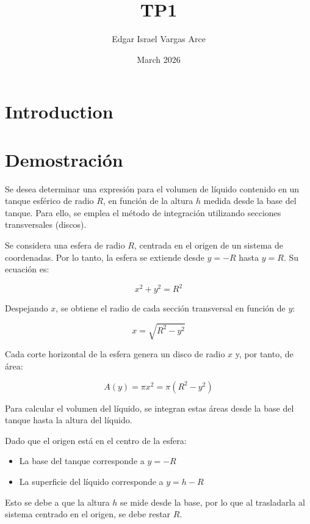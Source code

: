 \documentclass{article}
\title{TP1}
\author{Edgar Israel Vargas Arce}
\date{March 2026}
\begin{document}
\maketitle

\section{Introduction}

\section{Demostración}

Se desea determinar una expresión para el volumen de líquido contenido en un tanque esférico de radio $R$, en función de la altura $h$ medida desde la base del tanque. Para ello, se emplea el método de integración utilizando secciones transversales (discos).

Se considera una esfera de radio $R$, centrada en el origen de un sistema de coordenadas. Por lo tanto, la esfera se extiende desde $y = -R$ hasta $y = R$. Su ecuación es:

\begin{equation}
x^2 + y^2 = R^2
\end{equation}

Despejando $x$, se obtiene el radio de cada sección transversal en función de $y$:

\begin{equation}
x = \sqrt{R^2 - y^2}
\end{equation}

Cada corte horizontal de la esfera genera un disco de radio $x$ y, por tanto, de área:

\begin{equation}
A(y) = \pi x^2 = \pi (R^2 - y^2)
\end{equation}

Para calcular el volumen del líquido, se integran estas áreas desde la base del tanque hasta la altura del líquido.

Dado que el origen está en el centro de la esfera:
\begin{itemize}
\item La base del tanque corresponde a $y = -R$
\item La superficie del líquido corresponde a $y = h - R$
\end{itemize}

Esto se debe a que la altura $h$ se mide desde la base, por lo que al trasladarla al sistema centrado en el origen, se debe restar $R$.
\end{document}
